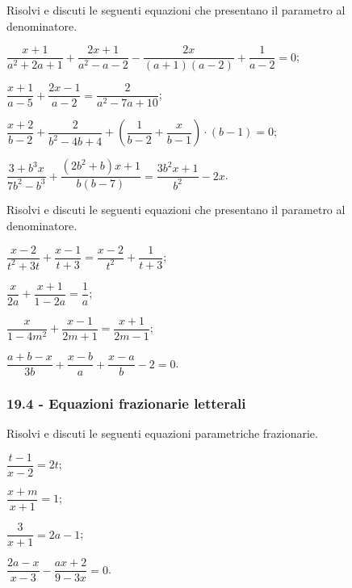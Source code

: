 \begin{esercizio}[\Ast]
\label{ese:19.13}
Risolvi e discuti le seguenti equazioni che presentano il parametro al denominatore.
\begin{enumeratea}
 \item $\dfrac{x+1}{a^{2}+2a+1}+\dfrac{2x+1}{a^{2}-a-2}-\dfrac{2x}{(a+1)(a-2)}+\dfrac{1}{a-2}=0$;
 \item $\dfrac{x+1}{a-5}+\dfrac{2x-1}{a-2}=\dfrac{2}{a^{2}-7a+10}$;
 \item $\dfrac{x+2}{b-2}+\dfrac{2}{b^{2}-4b+4}+\left(\dfrac{1}{b-2}+\dfrac{x}{b-1}\right)\cdot (b-1)=0$;
 \item $\dfrac{3+b^{3}x}{7b^{2}-b^{3}}+\dfrac{(2b^{2}+b)x+1}{b(b-7)}=\dfrac{3b^{2}x+1}{b^{2}}-2x$.
\end{enumeratea}
\end{esercizio}

\begin{esercizio}[\Ast]
\label{ese:19.14}
Risolvi e discuti le seguenti equazioni che presentano il parametro al denominatore.
\begin{multicols}{2}
\begin{enumeratea}
 \item $\dfrac{x-2}{t^{2}+3t}+\dfrac{x-1}{t+3}=\dfrac{x-2}{t^{2}}+\dfrac{1}{t+3}$;
 \item $\dfrac{x}{2a}+\dfrac{x+1}{1-2a}=\dfrac{1}{a}$;
 \item $\dfrac{x}{1-4m^{2}}+\dfrac{x-1}{2m+1}=\dfrac{x+1}{2m-1}$;
 \item $\dfrac{a+b-x}{3b}+\dfrac{x-b}{a}+\dfrac{x-a}{b}-2=0$.
\end{enumeratea}
\end{multicols}
\end{esercizio}

\pagebreak
\subsubsection*{19.4 - Equazioni frazionarie letterali}

\begin{esercizio}[\Ast]
\label{ese:19.15}
Risolvi e discuti le seguenti equazioni parametriche frazionarie.
\begin{multicols}{2}
\begin{enumeratea}
 \item $\dfrac{t-1}{x-2}=2t$;
 \item $\dfrac{x+m}{x+1}=1$;
 \item $\dfrac{3}{x+1}=2a-1$;
 \item $\dfrac{2a-x}{x-3}-\dfrac{ax+2}{9-3x}=0$.
\end{enumeratea}
\end{multicols}
\end{esercizio}

